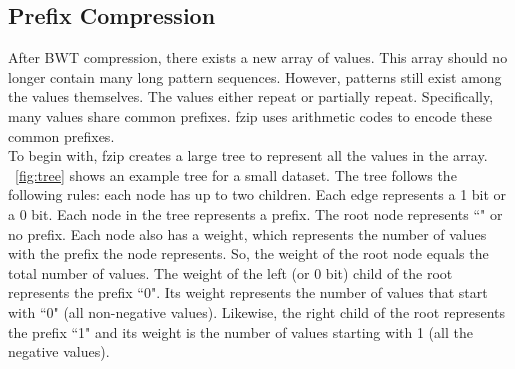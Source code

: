 \subsection{Prefix Compression}
After BWT compression, there exists a new array of values. This array should no longer contain many long pattern sequences. However, patterns still exist among the values themselves. The values either repeat or partially repeat. Specifically, many values share common prefixes. fzip uses arithmetic codes to encode these common prefixes.\\
\indent To begin with, fzip creates a large tree to represent all the values in the array. \figurename~\ref{fig:tree} shows an example tree for a small dataset. The tree follows the following rules: each node has up to two children. Each edge represents a 1 bit or a 0 bit. Each node in the tree represents a prefix. The root node represents ``" or no prefix. Each node also has a weight, which represents the number of values with the prefix the node represents. So, the weight of the root node equals the total number of values. The weight of the left (or 0 bit) child of the root represents the prefix ``0". Its weight represents the number of  values that start with ``0" (all non-negative values). Likewise, the right child of the root represents the prefix ``1" and its weight is the number of values starting with 1 (all the negative values).\\

